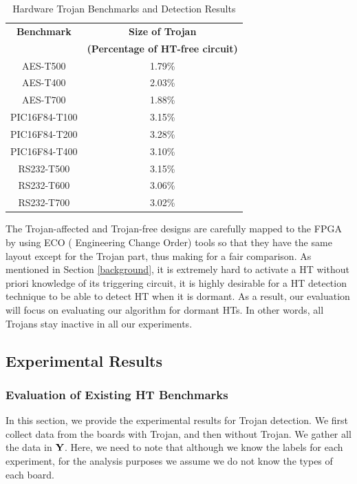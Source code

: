 \documentclass[journal]{IEEEtran}
\begin{document}
\bgroup
\def\arraystretch{1.5}%
\begin{table}
	\centering
	\caption{Hardware Trojan Benchmarks and Detection Results}
	\begin{tabular}{|c|c|} 
		\hline
		\textbf{Benchmark} & \textbf{Size of Trojan} \\ 
		& \textbf{(Percentage of HT-free circuit)}  \\
			
		\hline
		AES-T500 & 1.79\% \\
		\hline
		AES-T400 & 2.03\% \\
		\hline
		AES-T700 & 1.88\% \\
		\hline
		PIC16F84-T100 & 3.15\% \\
		\hline
		PIC16F84-T200 & 3.28\% \\
		\hline
		PIC16F84-T400 & 3.10\% \\
		\hline
		RS232-T500 & 3.15\%  \\
		\hline
		RS232-T600 & 3.06\% \\
		\hline
		RS232-T700 & 3.02\% \\
		
		\hline
	\end{tabular}
	\label{table:benchmark}
\end{table}
\egroup

The Trojan-affected and Trojan-free designs are carefully mapped to the FPGA by using ECO ( Engineering Change Order) tools so that they have the same layout except for the Trojan part, thus making for a fair comparison. As mentioned in Section \ref{background}, it is extremely hard to activate a HT without priori knowledge of its triggering circuit, it is highly desirable for a HT detection technique to be able to detect HT when it is dormant. As a result, our evaluation will focus on evaluating our algorithm for dormant HTs. In other words, all Trojans stay inactive in all our experiments.

\subsection{Experimental Results}
\label{sec:experiment}
\subsubsection{Evaluation of Existing HT Benchmarks}
In this section, we provide the experimental results for Trojan detection. We first collect data from the boards with Trojan, and then without Trojan. We gather all the data in  ${\bf Y}$. Here, we need to note that although we know the labels for each experiment, for the analysis purposes we assume we do not know the types of each board. 
\end{document}
